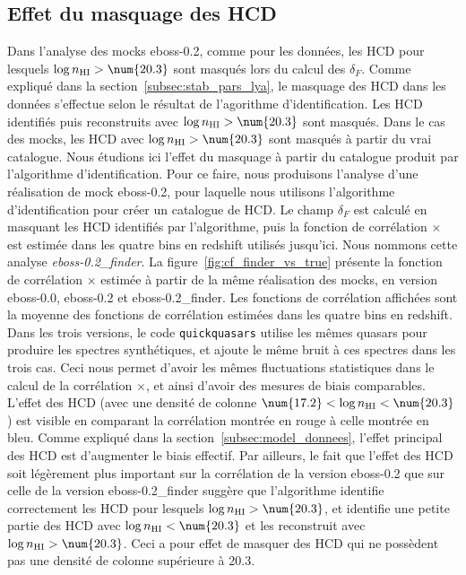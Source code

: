 \subsection{Effet du masquage des HCD}
\label{subsec:effet_masquage_hcd}
Dans l'analyse des mocks eboss-0.2, comme pour les données, les HCD pour lesquels $\log n_{\textsc{HI}} > \num{20.3}$ sont masqués lors du calcul des $\delta_F$.
Comme expliqué dans la section~\ref{subsec:stab_pars_lya}, le masquage des HCD dans les données s'effectue selon le résultat de l'agorithme d'identification. Les HCD identifiés puis reconstruits avec $\log n_{\textsc{HI}} > \num{20.3}$ sont masqués. Dans le cas des mocks, les HCD avec $\log n_{\textsc{HI}} > \num{20.3}$ sont masqués à partir du \og vrai \fg catalogue. Nous étudions ici l'effet du masquage à partir du catalogue produit par l'algorithme d'identification.
Pour ce faire, nous produisons l'analyse d'une réalisation de mock eboss-0.2, pour laquelle nous utilisons l'algorithme d'identification pour créer un catalogue de HCD. Le champ $\delta_F$ est calculé en masquant les HCD identifiés par l'algorithme, puis la fonction de corrélation \lya{}$\times$\lya{} est estimée dans les quatre bins en redshift utilisés jusqu'ici. Nous nommons cette analyse \emph{eboss-0.2\_finder}.
La figure~\ref{fig:cf_finder_vs_true} présente la fonction de corrélation \lya{}$\times$\lya{} estimée à partir de la même réalisation des mocks, en version eboss-0.0, eboss-0.2 et eboss-0.2\_finder.
Les fonctions de corrélation affichées sont la moyenne des fonctions de corrélation estimées dans les quatre bins en redshift.
Dans les trois versions, le code \texttt{quickquasars} utilise les mêmes quasars pour produire les spectres synthétiques, et ajoute le même bruit à ces spectres dans les trois cas. Ceci nous permet d'avoir les mêmes fluctuations statistiques dans le calcul de la corrélation \lya{}$\times$\lya{}, et ainsi d'avoir des mesures de biais comparables.
L'effet des HCD (avec une densité de colonne $\num{17.2} < \log n_{\textsc{HI}} < \num{20.3}$) est visible en comparant la corrélation montrée en rouge à celle montrée en bleu. Comme expliqué dans la section~\ref{subsec:model_donnees}, l'effet principal des HCD est d'augmenter le biais effectif.
Par ailleurs, le fait que l'effet des HCD soit légèrement plus important sur la corrélation de la version eboss-0.2 que sur celle de la version  eboss-0.2\_finder suggère que l'algorithme identifie correctement les HCD pour lesquels $\log n_{\textsc{HI}} > \num{20.3}$, et identifie une petite partie des HCD avec $\log n_{\textsc{HI}} < \num{20.3}$ et les reconstruit avec $\log n_{\textsc{HI}} > \num{20.3}$. Ceci a pour effet de masquer des HCD qui ne possèdent pas une densité de colonne supérieure à \num{20.3}.

